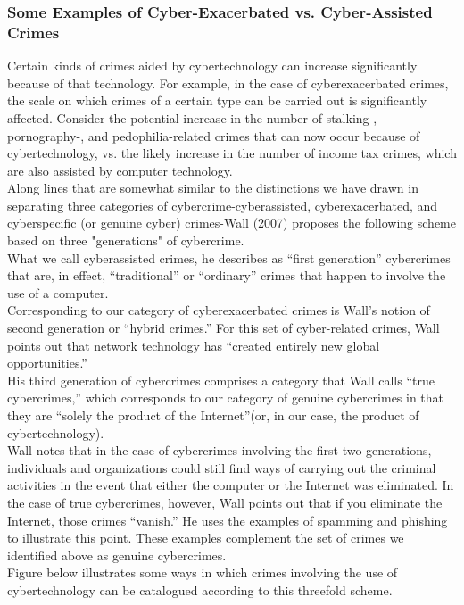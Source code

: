 \documentclass[12pt]{article}
\theoremstyle{definition}
\begin{document}
\subsubsection{Some Examples of Cyber-Exacerbated vs. Cyber-Assisted Crimes}
Certain kinds of crimes aided by cybertechnology can increase significantly because of
that technology. For example, in the case of cyberexacerbated crimes, the scale on which
crimes of a certain type can be carried out is significantly affected. Consider the potential
increase in the number of stalking-, pornography-, and pedophilia-related crimes that can
now occur because of cybertechnology, vs. the likely increase in the number of income tax
crimes, which are also assisted by computer technology.\\
Along lines that are somewhat similar to the distinctions we have drawn in separating
three categories of cybercrime-cyberassisted, cyberexacerbated, and cyberspecific (or
genuine cyber) crimes-Wall (2007) proposes the following scheme based on three
"generations" of cybercrime.\\
What we call cyberassisted crimes, he describes as “first
generation” cybercrimes that are, in effect, “traditional” or “ordinary” crimes that
happen to involve the use of a computer. \\
Corresponding to our category of cyberexacerbated
crimes is Wall’s notion of second generation or “hybrid crimes.” For this set
of cyber-related crimes, Wall points out that network technology has “created entirely
new global opportunities.” \\
His third generation of cybercrimes comprises a category that
Wall calls “true cybercrimes,” which corresponds to our category of genuine cybercrimes
in that they are “solely the product of the Internet”(or, in our case, the product of
cybertechnology).\\
Wall notes that in the case of cybercrimes involving the first two generations,
individuals and organizations could still find ways of carrying out the criminal activities
in the event that either the computer or the Internet was eliminated. In the case of true
cybercrimes, however, Wall points out that if you eliminate the Internet, those crimes
“vanish.” He uses the examples of spamming and phishing to illustrate this point. These
examples complement the set of crimes we identified above as genuine cybercrimes.\\
Figure below illustrates some ways in which crimes involving the use of cybertechnology
can be catalogued according to this threefold scheme.\\
\end{document}

